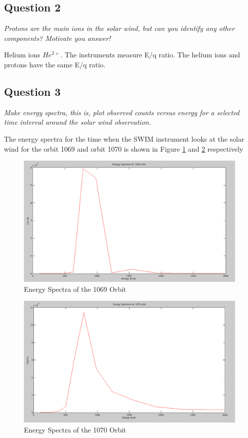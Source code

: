 \documentclass{article}
\begin{document}
\subsection{Question 2}
\textit{Protons are the main ions in the solar wind, but can you identify any other
components? Motivate you answer!}

Helium ions $He^{2+}$. The instruments measure E/q ratio. The helium ions and protons have the same E/q ratio.

\subsection{Question 3}
\textit{Make energy spectra, this is, plot observed counts versus energy for a selected
time interval around the solar wind observation.}

The energy spectra for the time when the SWIM instrument looks at the solar wind for the orbit 1069 and orbit 1070 is shown in Figure \ref{fig:energy_spectra_1069} and \ref{fig:energy_spectra_1070} respectively

\begin{figure}[htb!]
\centering
\includegraphics[scale = 0.35]{Figures/energy_spectra_1069.png}
\caption{Energy Spectra of the 1069 Orbit}
\label{fig:energy_spectra_1069}
\end{figure}

\begin{figure}[htb!]
\centering
\includegraphics[scale = 0.35]{Figures/energy_spectra_1070.png}
\caption{Energy Spectra of the 1070 Orbit}
\label{fig:energy_spectra_1070}
\end{figure}
\end{document}
